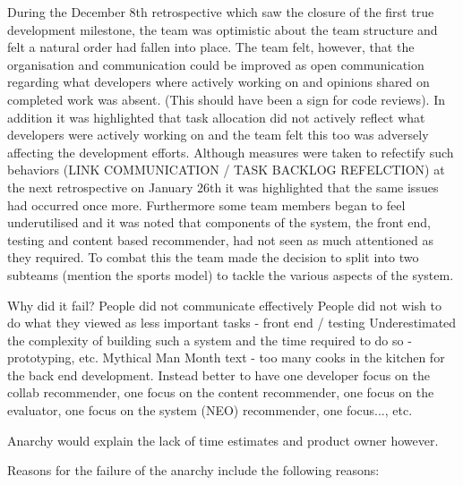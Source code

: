 \documentclass{l3proj}
\begin{document}
During the December 8th retrospective which saw the closure of the first true development milestone, the team was optimistic about the team structure and felt a natural order had fallen into place. The team felt, however, that the organisation and communication could be improved as open communication regarding what developers where actively working on and opinions shared on completed work was absent. (This should have been a sign for code reviews). In addition it was highlighted that task allocation did not actively reflect what developers were actively working on and the team felt this too was adversely affecting the development efforts. Although measures were taken to refectify such behaviors (LINK COMMUNICATION / TASK BACKLOG REFELCTION) at the next retrospective on January 26th it was highlighted that the same issues had occurred once more. Furthermore some team members began to feel underutilised and it was noted that components of the system, the front end, testing and content based recommender, had not seen as much attentioned as they required. To combat this the team made the decision to split into two subteams (mention the sports model) to tackle the various aspects of the system.  

Why did it fail?
People did not communicate effectively
People did not wish to do what they viewed as less important tasks - front end / testing
Underestimated the complexity of building such a system and the time required to do so - prototyping, etc.
Mythical Man Month text - too many cooks in the kitchen for the back end development. Instead better to have one developer focus on the collab recommender, one focus on the content recommender, one focus on the evaluator, one focus on the system (NEO) recommender, one focus..., etc.

Anarchy would explain the lack of time estimates and product owner however.

Reasons for the failure of the anarchy include the following reasons:
\end{document}
